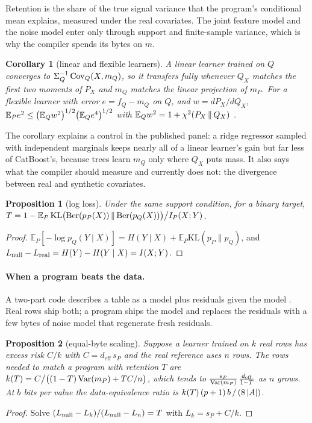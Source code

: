 \documentclass{article}
\newtheorem{proposition}{Proposition}
\newtheorem{corollary}{Corollary}
\theoremstyle{remark}
\newcommand{\E}{\mathbb{E}}
\newcommand{\Var}{\operatorname{Var}}
\newcommand{\Sq}[1]{{#1}^{\Two}}
\begin{document}
Retention is the share of the true signal variance that the program's conditional mean explains,
measured under the real covariates. The joint feature model and the noise model enter only through
support and finite-sample variance, which is why the compiler spends its bytes on $m$.

\begin{corollary}[linear and flexible learners]
\label{cor:support}
A linear learner trained on $Q$ converges to $\Sigma_Q^{-1}\operatorname{Cov}_Q(X, m_Q)$, so it
transfers fully whenever $Q_X$ matches the first two moments of $P_X$ and $m_Q$ matches the linear
projection of $m_P$. For a flexible learner with error $e = f_Q - m_Q$ on $Q$, and $w = dP_X/dQ_X$,
$\E_P\Sq{e} \le \bigl(\E_Q\Sq{w}\bigr)^{\One/\Two}\bigl(\E_Q e^{\Four}\bigr)^{\One/\Two}$
with $\E_Q\Sq{w} = \One + \chi^{\Two}(P_X\,\|\,Q_X)$ \citep{shimodaira2000improving}.
\end{corollary}

The corollary explains a control in the published panel: a ridge regressor sampled with independent
marginals keeps nearly all of a linear learner's gain but far less of CatBoost's, because trees learn
$m_Q$ only where $Q_X$ puts mass. It also says what the compiler should measure and currently does not:
the divergence between real and synthetic covariates.

\begin{proposition}[log loss]
\label{prop:logloss}
Under the same support condition, for a binary target, $T = \One - \E_P\,\mathrm{KL}\bigl(\mathrm{Ber}(p_P(X))\,\|\,\mathrm{Ber}(p_Q(X))\bigr)\big/ I_P(X;Y)$.
\end{proposition}
\begin{proof}
$\E_P[-\log p_Q(Y\mid X)] = H(Y\mid X) + \E_P\mathrm{KL}(p_P\|p_Q)$, and
$L_{\mathrm{null}} - L_{\mathrm{real}} = H(Y) - H(Y\mid X) = I(X;Y)$.
\end{proof}

\paragraph{When a program beats the data.} A two-part code describes a table as a model plus residuals
given the model \citep{rissanen1978modeling}. Real rows ship both; a program ships the model and replaces
the residuals with a few bytes of noise model that regenerate fresh residuals.

\begin{proposition}[equal-byte scaling]
\label{prop:scaling}
Suppose a learner trained on $k$ real rows has excess risk $C/k$ with $C = d_{\mathrm{eff}}\, s_P$ and the
real reference uses $n$ rows. The rows needed to match a program with retention $T$ are
$k(T) = C\big/\bigl((\One - T)\Var(m_P) + T C/n\bigr)$, which tends to
$\frac{s_P}{\Var(m_P)}\,\frac{d_{\mathrm{eff}}}{\One - T}$ as $n$ grows. At $b$ bits per value the
data-equivalence ratio is $k(T)\,(p+1)\,b \,/\, (8\,|A|)$.
\end{proposition}
\begin{proof}
Solve $(L_{\mathrm{null}} - L_k)/(L_{\mathrm{null}} - L_n) = T$ with $L_k = s_P + C/k$.
\end{proof}
\end{document}
